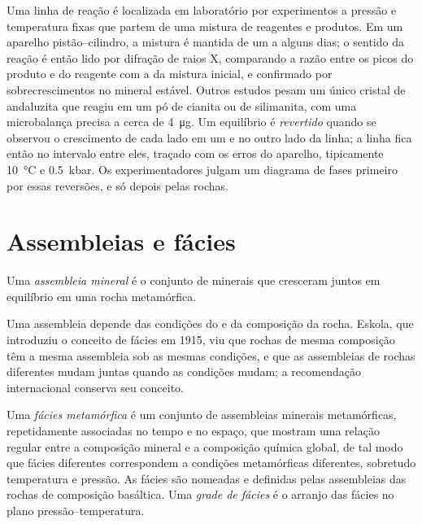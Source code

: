 \begin{inthelab}
Uma linha de reação é localizada em laboratório por experimentos a pressão e
temperatura fixas que partem de uma mistura de reagentes e produtos. Em um aparelho
pistão--cilindro, a mistura é mantida de um a alguns dias; o sentido da reação é então
lido por difração de raios X, comparando a razão entre os picos do produto e do reagente
com a da mistura inicial, e confirmado por sobrecrescimentos no mineral estável. Outros
estudos pesam um único cristal de andaluzita que reagiu em um pó de cianita ou de
silimanita, com uma microbalança precisa a cerca de \qty{4}{\micro g}. Um equilíbrio é
\emph{revertido} quando se observou o crescimento de cada lado em um e no outro lado da linha;
a linha fica então no intervalo entre eles, traçado com os erros do aparelho,
tipicamente \qty{10}{\celsius} e \qty{0.5}{kbar}. Os experimentadores julgam um diagrama de fases primeiro
por essas reversões, e só depois pelas rochas.
\end{inthelab}

\section{Assembleias e fácies}\label{sec:b2:metamorphic-facies:facies}

\begin{definition}\label{def:b2:metamorphic-facies:assemblage}
Uma \emph{assembleia mineral} é o conjunto de minerais que cresceram
juntos em equilíbrio em uma rocha metamórfica.
\end{definition}

Uma assembleia depende das condições do  e da composição da
rocha. Eskola, que introduziu o conceito de fácies em 1915, viu que rochas de mesma
composição têm a mesma assembleia sob as mesmas condições, e que as
assembleias de rochas diferentes mudam juntas quando as condições mudam; a
recomendação internacional conserva seu conceito.

\begin{definition}\label{def:b2:metamorphic-facies:facies}
Uma \emph{fácies metamórfica} é um conjunto de assembleias minerais
metamórficas, repetidamente associadas no tempo e no espaço, que mostram uma relação regular
entre a composição mineral e a composição química global, de tal modo que fácies diferentes
correspondem a condições metamórficas diferentes, sobretudo temperatura e pressão. As
fácies são nomeadas e definidas pelas assembleias das rochas de composição basáltica. Uma
\emph{grade de fácies} é o arranjo das fácies no
plano pressão--temperatura.
\end{definition}

